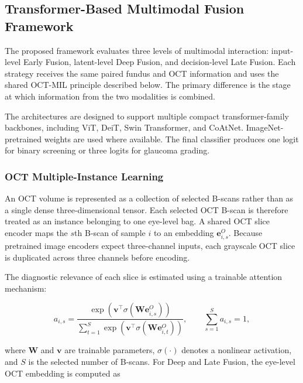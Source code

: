 \documentclass{ieeeaccess}
\begin{document}
\subsection{Transformer-Based Multimodal Fusion Framework}
\label{subsec:fusion_framework}

The proposed framework evaluates three levels of multimodal interaction: input-level Early Fusion, latent-level Deep Fusion, and decision-level Late Fusion. Each strategy receives the same paired fundus and OCT information and uses the shared OCT-MIL principle described below. The primary difference is the stage at which information from the two modalities is combined.

The architectures are designed to support multiple compact transformer-family backbones, including ViT, DeiT, Swin Transformer, and CoAtNet. ImageNet-pretrained weights are used where available. The final classifier produces one logit for binary screening or three logits for glaucoma grading.

\subsubsection{OCT Multiple-Instance Learning}
\label{subsubsec:oct_mil}

An OCT volume is represented as a collection of selected B-scans rather than as a single dense three-dimensional tensor. Each selected OCT B-scan is therefore treated as an instance belonging to one eye-level bag. A shared OCT slice encoder maps the $s$th B-scan of sample $i$ to an embedding $\mathbf{e}_{i,s}^{O}$. Because pretrained image encoders expect three-channel inputs, each grayscale OCT slice is duplicated across three channels before encoding.

The diagnostic relevance of each slice is estimated using a trainable attention mechanism:

\begin{equation}
    a_{i,s} =
    \frac{
        \exp\!\left(
        \mathbf{v}^{\top}
        \sigma\!\left(\mathbf{W}\mathbf{e}_{i,s}^{O}\right)
        \right)
    }{
        \sum_{t=1}^{S}
        \exp\!\left(
        \mathbf{v}^{\top}
        \sigma\!\left(\mathbf{W}\mathbf{e}_{i,t}^{O}\right)
        \right)
    },
    \qquad
    \sum_{s=1}^{S}a_{i,s}=1,
    \label{eq:mil_attention}
\end{equation}

where $\mathbf{W}$ and $\mathbf{v}$ are trainable parameters, $\sigma(\cdot)$ denotes a nonlinear activation, and $S$ is the selected number of B-scans. For Deep and Late Fusion, the eye-level OCT embedding is computed as
\end{document}
